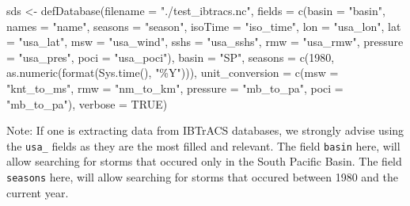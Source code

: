 \documentclass[
]{article}
\newenvironment{Shaded}{\begin{snugshade}}{\end{snugshade}}
\newcommand{\AttributeTok}[1]{\textcolor[rgb]{0.77,0.63,0.00}{#1}}
\newcommand{\ConstantTok}[1]{\textcolor[rgb]{0.00,0.00,0.00}{#1}}
\newcommand{\DecValTok}[1]{\textcolor[rgb]{0.00,0.00,0.81}{#1}}
\newcommand{\FunctionTok}[1]{\textcolor[rgb]{0.00,0.00,0.00}{#1}}
\newcommand{\NormalTok}[1]{#1}
\newcommand{\OtherTok}[1]{\textcolor[rgb]{0.56,0.35,0.01}{#1}}
\newcommand{\StringTok}[1]{\textcolor[rgb]{0.31,0.60,0.02}{#1}}
\begin{document}
\begin{Shaded}
\begin{Highlighting}[]
\NormalTok{sds }\OtherTok{\textless{}{-}} \FunctionTok{defDatabase}\NormalTok{(}\AttributeTok{filename =} \StringTok{"./test\_ibtracs.nc"}\NormalTok{,}
                   \AttributeTok{fields =} \FunctionTok{c}\NormalTok{(}\AttributeTok{basin =} \StringTok{"basin"}\NormalTok{,}
                              \AttributeTok{names =} \StringTok{"name"}\NormalTok{,}
                              \AttributeTok{seasons =} \StringTok{"season"}\NormalTok{,}
                              \AttributeTok{isoTime =} \StringTok{"iso\_time"}\NormalTok{,}
                              \AttributeTok{lon =} \StringTok{"usa\_lon"}\NormalTok{,}
                              \AttributeTok{lat =} \StringTok{"usa\_lat"}\NormalTok{,}
                              \AttributeTok{msw =} \StringTok{"usa\_wind"}\NormalTok{,}
                              \AttributeTok{sshs =} \StringTok{"usa\_sshs"}\NormalTok{,}
                              \AttributeTok{rmw =} \StringTok{"usa\_rmw"}\NormalTok{,}
                              \AttributeTok{pressure =} \StringTok{"usa\_pres"}\NormalTok{,}
                              \AttributeTok{poci =} \StringTok{"usa\_poci"}\NormalTok{),}
                   \AttributeTok{basin =} \StringTok{"SP"}\NormalTok{,}
                   \AttributeTok{seasons =} \FunctionTok{c}\NormalTok{(}\DecValTok{1980}\NormalTok{, }\FunctionTok{as.numeric}\NormalTok{(}\FunctionTok{format}\NormalTok{(}\FunctionTok{Sys.time}\NormalTok{(), }\StringTok{"\%Y"}\NormalTok{))),}
                   \AttributeTok{unit\_conversion =} \FunctionTok{c}\NormalTok{(}\AttributeTok{msw =} \StringTok{"knt\_to\_ms"}\NormalTok{,}
                                       \AttributeTok{rmw =} \StringTok{"nm\_to\_km"}\NormalTok{,}
                                       \AttributeTok{pressure =} \StringTok{"mb\_to\_pa"}\NormalTok{,}
                                       \AttributeTok{poci =} \StringTok{"mb\_to\_pa"}\NormalTok{),}
                   \AttributeTok{verbose =} \ConstantTok{TRUE}\NormalTok{)}
\end{Highlighting}
\end{Shaded}

Note: If one is extracting data from IBTrACS databases, we strongly
advise using the \texttt{usa\_} fields as they are the most filled and
relevant. The field \texttt{basin} here, will allow searching for storms
that occured only in the South Pacific Basin. The field \texttt{seasons}
here, will allow searching for storms that occured between 1980 and the
current year.
\end{document}

